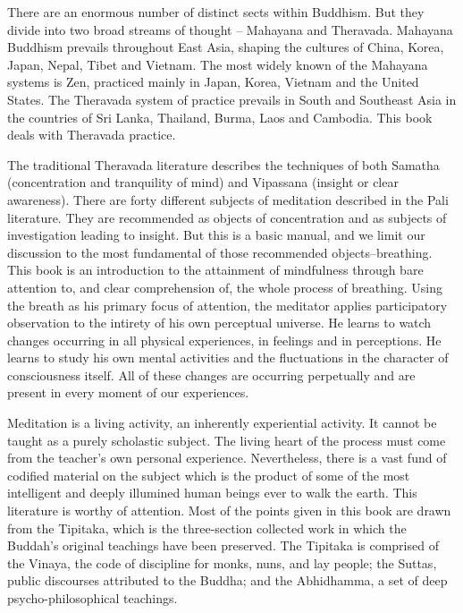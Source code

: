 There are an enormous number of distinct sects within Buddhism. But they divide into two broad streams of thought -- Mahayana
and Theravada. Mahayana Buddhism prevails throughout East Asia, shaping the cultures of China, Korea, Japan, Nepal, Tibet and
Vietnam. The most widely known of the Mahayana systems is Zen, practiced mainly in Japan, Korea, Vietnam and the United
States. The Theravada system of practice prevails in South and Southeast Asia in the countries of Sri Lanka, Thailand, Burma,
Laos and Cambodia. This book deals with Theravada practice.

The traditional Theravada literature describes the techniques of both Samatha (concentration and tranquility of mind) and
Vipassana (insight or clear awareness). There are forty different subjects of meditation described in the Pali literature. They are
recommended as objects of concentration and as subjects of investigation leading to insight. But this is a basic manual, and we
limit our discussion to the most fundamental of those recommended objects--breathing. This book is an introduction to the
attainment of mindfulness through bare attention to, and clear comprehension of, the whole process of breathing. Using the breath
as his primary focus of attention, the meditator applies participatory observation to the intirety of his own perceptual universe. He
learns to watch changes occurring in all physical experiences, in feelings and in perceptions. He learns to study his own mental
activities and the fluctuations in the character of consciousness itself. All of these changes are occurring perpetually and are present
in every moment of our experiences.

Meditation is a living activity, an inherently experiential activity. It cannot be taught as a purely scholastic subject. The living
heart of the process must come from the teacher's own personal experience. Nevertheless, there is a vast fund of codified material on
the subject which is the product of some of the most intelligent and deeply illumined human beings ever to walk the earth. This
literature is worthy of attention. Most of the points given in this book are drawn from the Tipitaka, which is the three-section
collected work in which the Buddah's original teachings have been preserved. The Tipitaka is comprised of the Vinaya, the code of
discipline for monks, nuns, and lay people; the Suttas, public discourses attributed to the Buddha; and the Abhidhamma, a set of
deep psycho-philosophical teachings.

